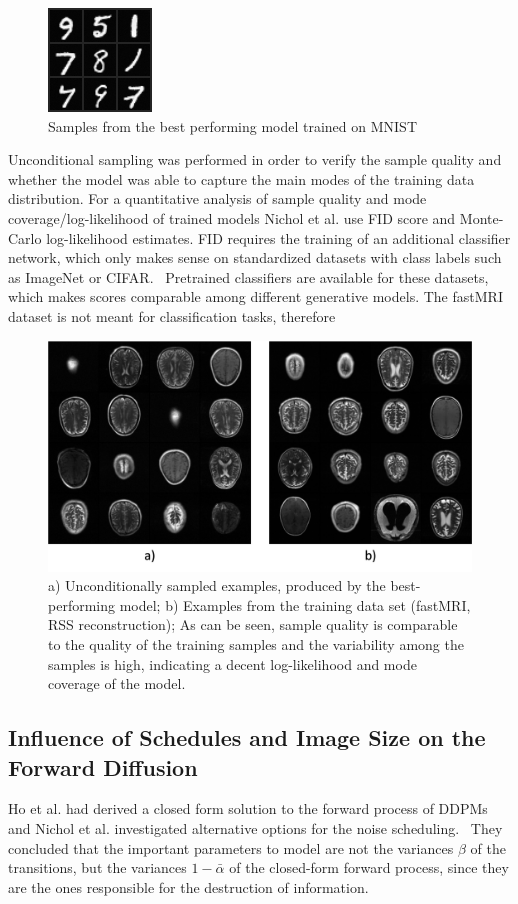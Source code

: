 \begin{figure}[h]
    \centering
    \includegraphics[width=.15\textwidth]{images/mnistsamples.png}
    \caption[Samples generated from MNIST]{Samples from the best performing model trained on MNIST}
    \label{fig:mnistsamples}
\end{figure}

Unconditional sampling was performed in order to verify the sample quality and whether the model was able to capture the main modes of the training data distribution. For a quantitative analysis of sample quality and mode coverage/log-likelihood of trained models Nichol et al. use FID score and Monte-Carlo log-likelihood estimates. FID requires the training of an additional classifier network, which only makes sense on standardized datasets with class labels such as ImageNet or CIFAR.~\autocite{imagenet, cifar} Pretrained classifiers are available for these datasets, which makes scores comparable among different generative models. The fastMRI dataset is not meant for classification tasks, therefore
\begin{figure}[h]
    \centering
    \includegraphics[width=.66\textwidth]{images/samples_unconditional.png}
    \caption[Samples from Data Set and Unconditional Sampling]{a) Unconditionally sampled examples, produced by the best-performing model; b) Examples from the training data set (fastMRI, RSS reconstruction); As can be seen, sample quality is comparable to the quality of the training samples and the variability among the samples is high, indicating a decent log-likelihood and mode coverage of the model.}
    \label{fig:uncondsampling}
\end{figure}

\subsection{Influence of Schedules and Image Size on the Forward Diffusion}
\label{sec:forward_diff_experiments}
Ho et al. had derived a closed form solution to the forward process of DDPMs and Nichol et al. investigated alternative options for the noise scheduling.~\autocite{ho2020denoising,nichol2021improved} They concluded that the important parameters to model are not the variances $\beta$ of the transitions, but the variances $1-\bar{\alpha}$ of the closed-form forward process, since they are the ones responsible for the destruction of information.


